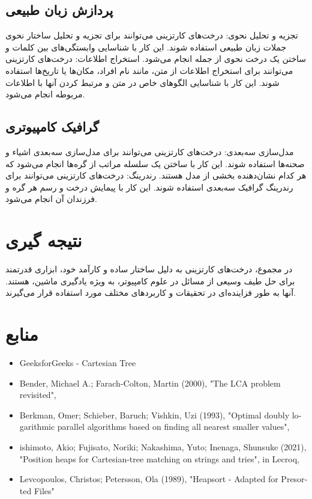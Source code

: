 \documentclass{article}
\begin{document}
\subsection{ پردازش زبان طبیعی}
تجزیه و تحلیل نحوی: درخت‌های کارتزینی می‌توانند برای تجزیه و تحلیل ساختار نحوی جملات زبان طبیعی استفاده شوند. این کار با شناسایی وابستگی‌های بین کلمات و ساختن یک درخت نحوی از جمله انجام می‌شود.
\newline استخراج اطلاعات: درخت‌های کارتزینی می‌توانند برای استخراج اطلاعات از متن، مانند نام افراد، مکان‌ها یا تاریخ‌ها استفاده شوند. این کار با شناسایی الگوهای خاص در متن و مرتبط کردن آنها با اطلاعات مربوطه انجام می‌شود.
\subsection{ گرافیک کامپیوتری}
مدل‌سازی سه‌بعدی: درخت‌های کارتزینی می‌توانند برای مدل‌سازی سه‌بعدی اشیاء و صحنه‌ها استفاده شوند. این کار با ساختن یک سلسله مراتب از گره‌ها انجام می‌شود که هر کدام نشان‌دهنده بخشی از مدل هستند.
\newline رندرینگ: درخت‌های کارتزینی می‌توانند برای رندرینگ گرافیک سه‌بعدی استفاده شوند. این کار با پیمایش درخت و رسم هر گره و فرزندان آن انجام می‌شود.
\section{نتیجه گیری}
در مجموع، درخت‌های کارتزینی به دلیل ساختار ساده و کارآمد خود، ابزاری قدرتمند برای حل طیف وسیعی از مسائل در علوم کامپیوتر، به ویژه یادگیری ماشین، هستند. آنها به طور فزاینده‌ای در تحقیقات و کاربردهای مختلف مورد استفاده قرار می‌گیرند.
\section{منابع}
\begin{latin}
\begin{itemize}
\item GeeksforGeeks - Cartesian Tree
\item Bender, Michael A.; Farach-Colton, Martin (2000), "The LCA problem revisited",
\item Berkman, Omer; Schieber, Baruch; Vishkin, Uzi (1993), "Optimal doubly logarithmic parallel algorithms based on finding all nearest smaller values",
\item ishimoto, Akio; Fujisato, Noriki; Nakashima, Yuto; Inenaga, Shunsuke (2021), "Position heaps for Cartesian-tree matching on strings and tries", in Lecroq,
\item Levcopoulos, Christos; Petersson, Ola (1989), "Heapsort - Adapted for Presorted Files"
\end{itemize}
\end{latin}
\end{document}
